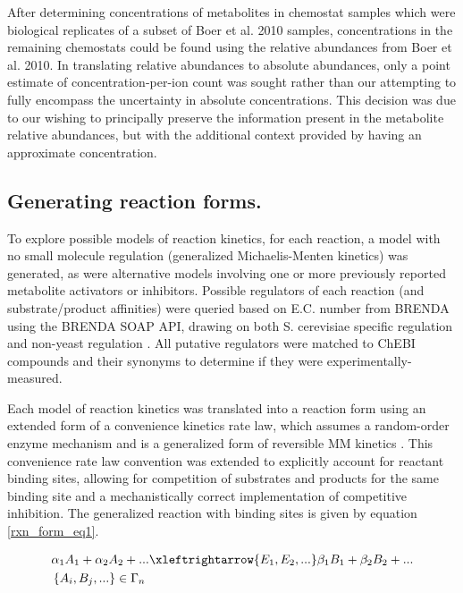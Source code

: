 After determining concentrations of metabolites in chemostat samples which were biological replicates of a subset of Boer et al. 2010 samples, concentrations in the remaining chemostats could be found using the relative abundances from Boer et al. 2010.  In translating relative abundances to absolute abundances, only a point estimate of concentration-per-ion count was sought rather than our attempting to fully encompass the uncertainty in absolute concentrations.  This decision was due to our wishing to principally preserve the information present in the metabolite relative abundances, but with the additional context provided by having an approximate concentration.

\subsection{Generating reaction forms.}

To explore possible models of reaction kinetics, for each reaction, a model with no small molecule regulation (generalized Michaelis-Menten kinetics) was generated, as were alternative models involving one or more previously reported metabolite activators or inhibitors.  Possible regulators of each reaction (and substrate/product affinities) were queried based on E.C. number from BRENDA using the BRENDA SOAP API, drawing on both S. cerevisiae specific regulation and non-yeast regulation \cite{Scheer:2011df}.  All putative regulators were matched to ChEBI compounds \cite{Degtyarenko:2008hx} and their synonyms to determine if they were experimentally-measured.

Each model of reaction kinetics was translated into a reaction form using an extended form of a convenience kinetics rate law, which assumes a random-order enzyme mechanism and is a generalized form of reversible MM kinetics \cite{main-Liebermeister:2006fm}. This convenience rate law convention was extended to explicitly account for reactant binding sites, allowing for competition of substrates and products for the same binding site and a mechanistically correct implementation of competitive inhibition. The generalized reaction with binding sites is given by equation \ref{rxn_form_eq1}.

\begin{align}
&\alpha_{1}A_{1} + \alpha_{2}A_{2} + ... \xleftrightarrow{E_{1}, E_{2}, ...} \beta_{1}B_{1} + \beta_{2}B_{2} + ...\notag\\
&\left\{A_{i}, B_{j}, ...\right\} \in \Gamma_{n}\label{rxn_form_eq1}
\end{align}

